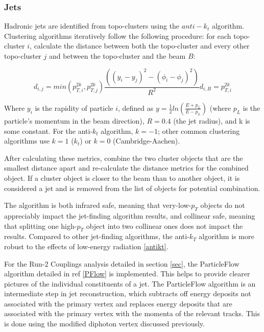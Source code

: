 \subsubsection{Jets} \label{sec:Jets} 

Hadronic jets are identified from topo-clusters using the $anti-k_{t}$ algorithm. Clustering algorithms iteratively follow the following procedure: for each topo-cluster $i$, calculate the distance between both the topo-cluster and every other topo-cluster $j$ and between the topo-cluster and the beam $B$: 

\begin{equation} 
d_{i,j} = min(p_{T,i}^{2k}, p_{T,j}^{2k})\frac{((y_{i}-y_{j})^{2}-(\phi_{i}-\phi_{j})^{2})}{R^2}
d_{i,B} = p_{T,i}^{2k}
\end{equation} 

Where $y_{i}$ is the rapidity of particle $i$, defined as $y=\frac{1}{2} ln(\frac{ E + p_{L}}{ E - p_{L}})$ (where $p_{L}$ is the particle's momentum in the beam direction), $R = 0.4$ (the jet radius), and k is some constant. For the anti-$k_{t}$ algorithm, $k = -1$; other common clustering algorithms use $k=1$ ($k_{t}$) or $k=0$ (Cambridge-Aachen). 

After calculating these metrics, combine the two cluster objects that are the smallest distance apart and re-calculate the distance metrics for the combined object. If a cluster object is closer to the beam than to another object, it is considered a jet and is removed from the list of objects for potential combination.

The algorithm is both infrared safe, meaning that very-low-$p_{T}$ objects do not appreciably impact the jet-finding algorithm results, and collinear safe, meaning that splitting one high-$p_{T}$ object into two collinear ones does not impact the results. Compared to other jet-finding algorithms, the anti-$k_{T}$ algorithm is more robust to the effects of low-energy radiation \ref{antikt}.

For the Run-2 Couplings analysis detailed in section \ref{sec}, the ParticleFlow algorithm detailed in ref \ref{PFlow} is implemented. This helps to provide clearer pictures of the individual constituents of a jet. The ParticleFlow algorithm is an intermediate step in jet reconstruction, which subtracts off energy deposits not associated with the primary vertex and replaces energy deposits that are associated with the primary vertex with the momenta of the relevant tracks. This is done using the modified diphoton vertex discussed previously.


